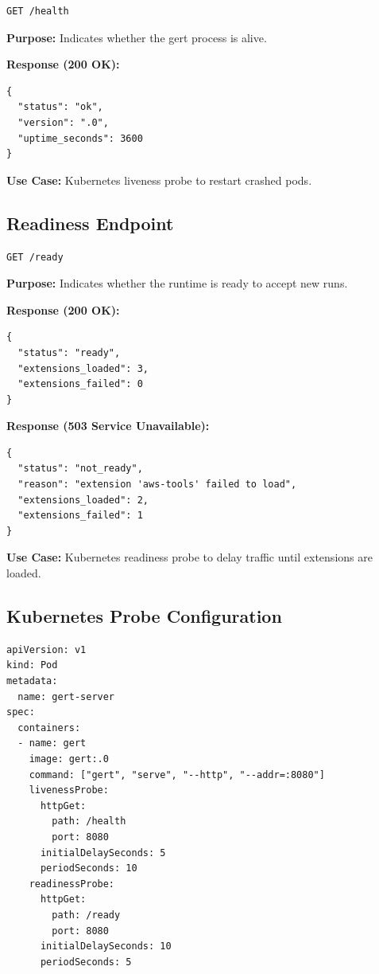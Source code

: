 \begin{verbatim}
GET /health
\end{verbatim}

\textbf{Purpose:} Indicates whether the gert process is alive.

\textbf{Response (200 OK):}
\begin{verbatim}
{
  "status": "ok",
  "version": ".0",
  "uptime_seconds": 3600
}
\end{verbatim}

\textbf{Use Case:} Kubernetes liveness probe to restart crashed pods.

\subsection{Readiness Endpoint}

\begin{verbatim}
GET /ready
\end{verbatim}

\textbf{Purpose:} Indicates whether the runtime is ready to accept new runs.

\textbf{Response (200 OK):}
\begin{verbatim}
{
  "status": "ready",
  "extensions_loaded": 3,
  "extensions_failed": 0
}
\end{verbatim}

\textbf{Response (503 Service Unavailable):}
\begin{verbatim}
{
  "status": "not_ready",
  "reason": "extension 'aws-tools' failed to load",
  "extensions_loaded": 2,
  "extensions_failed": 1
}
\end{verbatim}

\textbf{Use Case:} Kubernetes readiness probe to delay traffic until extensions are loaded.

\subsection{Kubernetes Probe Configuration}

\begin{verbatim}
apiVersion: v1
kind: Pod
metadata:
  name: gert-server
spec:
  containers:
  - name: gert
    image: gert:.0
    command: ["gert", "serve", "--http", "--addr=:8080"]
    livenessProbe:
      httpGet:
        path: /health
        port: 8080
      initialDelaySeconds: 5
      periodSeconds: 10
    readinessProbe:
      httpGet:
        path: /ready
        port: 8080
      initialDelaySeconds: 10
      periodSeconds: 5
\end{verbatim}

